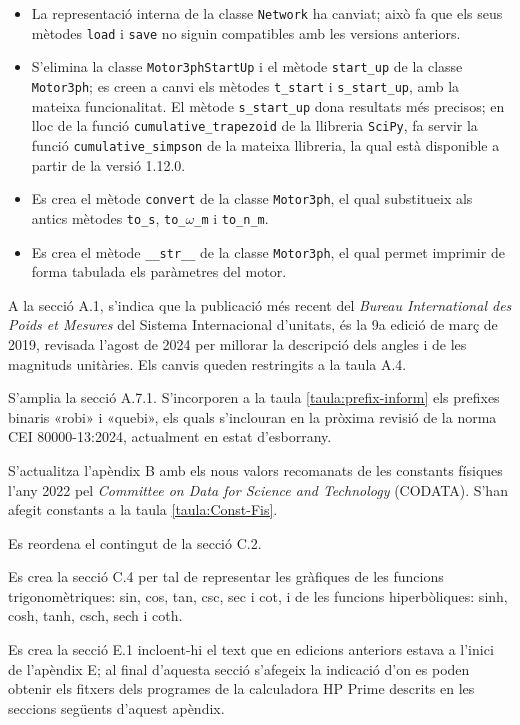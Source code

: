 \begin{itemize}
	\item La representació interna de la classe \texttt{Network} ha canviat; això fa que els seus mètodes \texttt{load} i  \texttt{save} no siguin compatibles amb les versions anteriors. 
	\item S'elimina la classe  \texttt{Motor3phStartUp} i el mètode  \texttt{start\_up} de la classe  \texttt{Motor3ph}; es creen a canvi els mètodes   \texttt{t\_start} i  \texttt{s\_start\_up}, amb la mateixa funcionalitat. 	El mètode \texttt{s\_start\_up} dona  resultats més precisos; en lloc de la  funció \texttt{cumulative\_trapezoid} de la llibreria \texttt{SciPy}, fa servir la funció \texttt{cumulative\_simpson} de la mateixa llibreria, la qual està disponible a partir de la versió 1.12.0. 
	\item Es crea el mètode \texttt{convert} de la classe \texttt{Motor3ph}, el qual substitueix als antics mètodes \texttt{to\_s},  \texttt{to\_$\omega$\_m} i \texttt{to\_n\_m}.
	\item Es crea el mètode  \texttt{\_\_str\_\_} de la classe \texttt{Motor3ph}, el qual permet imprimir de forma tabulada els paràmetres del motor.
\end{itemize}
	
 
A la secció A.1, s'indica que la publicació més recent del \textit{Bureau 	International des Poids et Mesures} del Sistema Internacional d'unitats, és la  9a edició de març de 2019, revisada l'agost de 2024 per millorar la descripció dels angles i de les 
magnituds unitàries. Els canvis queden restringits a la taula A.4.

S'amplia la secció A.7.1. S'incorporen a la taula \ref{taula:prefix-inform} els prefixes binaris «robi» i «quebi», els quals s'inclouran en la pròxima revisió de la norma CEI 80000-13:2024, actualment en estat d'esborrany.

S'actualitza l'apèndix  B amb els nous valors recomanats de les constants físiques  l'any 2022 pel \textit{Committee on Data for Science and Technology} (CODATA). S'han afegit constants a la taula \ref{taula:Const-Fis}.

Es reordena el contingut de la secció C.2.

Es crea la secció C.4 per tal de representar les gràfiques de les funcions trigonomètriques: sin, cos, tan, csc, sec i cot, i de les funcions hiperbòliques: sinh, cosh, tanh, csch, sech i coth.

Es crea la secció E.1 incloent-hi el text que en edicions anteriors estava a l'inici de l'apèndix E; al final d'aquesta secció s'afegeix la indicació d'on es poden obtenir els fitxers dels programes de la calculadora \textsf{HP Prime} descrits en les seccions següents d'aquest apèndix.

